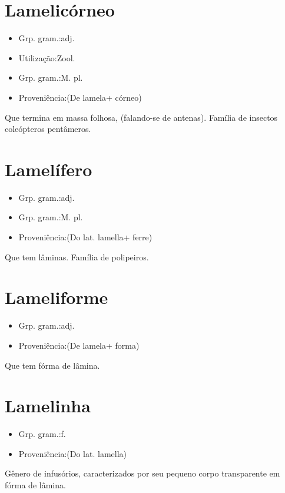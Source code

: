 \section{Lamelicórneo}
\begin{itemize}
\item {Grp. gram.:adj.}
\end{itemize}
\begin{itemize}
\item {Utilização:Zool.}
\end{itemize}
\begin{itemize}
\item {Grp. gram.:M. pl.}
\end{itemize}
\begin{itemize}
\item {Proveniência:(De \textunderscore lamela\textunderscore  + \textunderscore córneo\textunderscore )}
\end{itemize}
Que termina em massa folhosa, (falando-se de antenas).
Família de insectos coleópteros pentâmeros.
\section{Lamelífero}
\begin{itemize}
\item {Grp. gram.:adj.}
\end{itemize}
\begin{itemize}
\item {Grp. gram.:M. pl.}
\end{itemize}
\begin{itemize}
\item {Proveniência:(Do lat. \textunderscore lamella\textunderscore  + \textunderscore ferre\textunderscore )}
\end{itemize}
Que tem lâminas.
Família de polipeiros.
\section{Lameliforme}
\begin{itemize}
\item {Grp. gram.:adj.}
\end{itemize}
\begin{itemize}
\item {Proveniência:(De \textunderscore lamela\textunderscore  + \textunderscore forma\textunderscore )}
\end{itemize}
Que tem fórma de lâmina.
\section{Lamelinha}
\begin{itemize}
\item {Grp. gram.:f.}
\end{itemize}
\begin{itemize}
\item {Proveniência:(Do lat. \textunderscore lamella\textunderscore )}
\end{itemize}
Gênero de infusórios, caracterizados por seu pequeno corpo transparente em fórma de lâmina.
